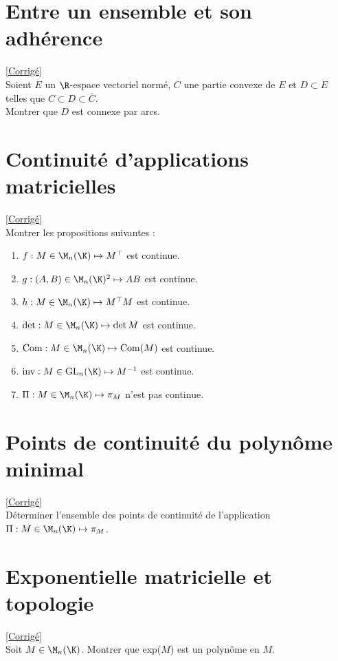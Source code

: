 \documentclass{book}
\begin{document}
\section{Entre un ensemble et son adhérence}
\label{Entre un ensemble et son aadhérence}
\textcolor{blue}{\hyperref[sec:entre-un-ensemble-et-son-adherence]{[Corrigé]}}\\
Soient $E$ un $\R$-espace vectoriel normé, $C$ une partie convexe de $E$ et $D\subset E$ telles que $C\subset D\subset \overline{C}$.\\
Montrer que $D$ est connexe par arcs.

\section{Continuité d'applications matricielles}
\label{Continuité d'applicaiton matricielles}
\textcolor{blue}{\hyperref[sec:continuite-dapplications-matricielles]{[Corrigé]}}\\
Montrer les propositions suivantes :
\begin{enumerate}
	\item $f:M\in \M_n(\K)\mapsto M^\top$ est continue.
	\item $g:(A,B)\in \M_n(\K)^2\mapsto AB$ est continue.
	\item $h:M\in \M_n(\K)\mapsto M^\top M$ est continue.
	\item $\det:M\in \M_n(\K)\mapsto \det M$ est continue.
	\item $\operatorname{Com}:M\in \M_n(\K)\mapsto \operatorname{Com}(M)$ est continue.
	\item $\text{inv}:M\in \text{GL}_n(\K)\mapsto M^{-1}$ est continue.
	\item $\Pi:M\in \M_n(\K)\mapsto \pi_M$ n'est pas continue.
\end{enumerate}

\section{Points de continuité du polynôme minimal}
\label{Points de continuité du polynôme minimal}
\textcolor{blue}{\hyperref[sec:points-de-continuite-du-polynome-minimal]{[Corrigé]}}\\
Déterminer l'ensemble des points de continuité de l'application $\Pi:M\in \M_n(\K)\mapsto \pi_M$.

\section{Exponentielle matricielle et topologie}
\label{Exponentielle matricielle et topologie}
\textcolor{blue}{\hyperref[sec:exponentielle-matricielle-et-topologie]{[Corrigé]}}\\
Soit $M\in \M_n(\K)$. Montrer que exp($M$) est un polynôme en $M$.
\end{document}
